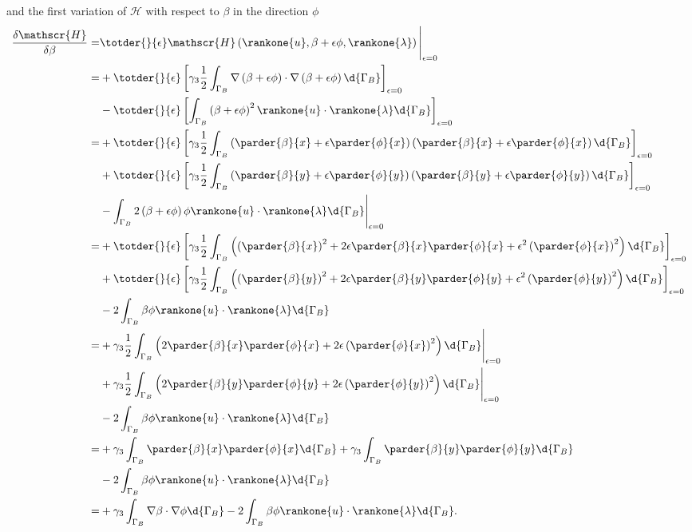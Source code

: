 and the first variation of $\mathscr{H}$ with respect to $\beta$ in the direction $\phi$
\begin{align*}
 \frac{\delta \mathscr{H}}{\delta \beta} =& \totder{}{\epsilon} \mathscr{H} \left(\rankone{u}, \beta + \epsilon \phi, \rankone{\lambda} \right) \Bigg|_{\epsilon = 0} \\
  =&+ \totder{}{\epsilon} \left[ \gamma_3 \frac{1}{2} \int_{\Gamma_B} \nabla \left(\beta + \epsilon \phi \right) \cdot \nabla \left(\beta + \epsilon \phi \right) \d{\Gamma_B} \right]_{\epsilon = 0} \\
  &- \totder{}{\epsilon} \left[ \int_{\Gamma_B} \left(\beta + \epsilon \phi\right)^2 \rankone{u} \cdot \rankone{\lambda} \d{\Gamma_B} \right]_{\epsilon = 0} \\
  =&+ \totder{}{\epsilon} \left[ \gamma_3 \frac{1}{2} \int_{\Gamma_B} \left(\parder{\beta}{x} + \epsilon \parder{\phi}{x} \right) \left(\parder{\beta}{x} + \epsilon \parder{\phi}{x} \right) \d{\Gamma_B} \right]_{\epsilon = 0} \\
  &+ \totder{}{\epsilon} \left[ \gamma_3 \frac{1}{2} \int_{\Gamma_B} \left(\parder{\beta}{y} + \epsilon \parder{\phi}{y} \right) \left(\parder{\beta}{y} + \epsilon \parder{\phi}{y} \right) \d{\Gamma_B} \right]_{\epsilon = 0} \\
  &- \int_{\Gamma_B} 2\left(\beta + \epsilon \phi\right)\phi \rankone{u} \cdot \rankone{\lambda} \d{\Gamma_B} \Bigg|_{\epsilon = 0} \\
  =&+ \totder{}{\epsilon} \left[ \gamma_3 \frac{1}{2} \int_{\Gamma_B} \left(\left(\parder{\beta}{x}\right)^2 + 2\epsilon \parder{\beta}{x}\parder{\phi}{x} + \epsilon^2 \left(\parder{\phi}{x}\right)^2 \right) \d{\Gamma_B} \right]_{\epsilon = 0} \\
  &+ \totder{}{\epsilon} \left[ \gamma_3 \frac{1}{2} \int_{\Gamma_B} \left(\left(\parder{\beta}{y}\right)^2 + 2\epsilon \parder{\beta}{y}\parder{\phi}{y} + \epsilon^2 \left(\parder{\phi}{y}\right)^2 \right) \d{\Gamma_B} \right]_{\epsilon = 0} \\
  &- 2 \int_{\Gamma_B} \beta \phi \rankone{u} \cdot \rankone{\lambda} \d{\Gamma_B} \\
  =&+ \gamma_3 \frac{1}{2} \int_{\Gamma_B} \left(2\parder{\beta}{x}\parder{\phi}{x} + 2\epsilon \left(\parder{\phi}{x}\right)^2 \right) \d{\Gamma_B} \Bigg|_{\epsilon = 0} \\
  &+ \gamma_3 \frac{1}{2} \int_{\Gamma_B} \left(2\parder{\beta}{y}\parder{\phi}{y} + 2\epsilon \left(\parder{\phi}{y}\right)^2 \right) \d{\Gamma_B} \Bigg|_{\epsilon = 0} \\
  &- 2 \int_{\Gamma_B} \beta \phi \rankone{u} \cdot \rankone{\lambda} \d{\Gamma_B} \\
  =&+ \gamma_3 \int_{\Gamma_B} \parder{\beta}{x}\parder{\phi}{x} \d{\Gamma_B} + \gamma_3 \int_{\Gamma_B} \parder{\beta}{y}\parder{\phi}{y} \d{\Gamma_B} \\
  &- 2 \int_{\Gamma_B} \beta \phi \rankone{u} \cdot \rankone{\lambda} \d{\Gamma_B} \\
  =&+ \gamma_3 \int_{\Gamma_B} \nabla \beta \cdot \nabla \phi \d{\Gamma_B} - 2 \int_{\Gamma_B} \beta \phi \rankone{u} \cdot \rankone{\lambda} \d{\Gamma_B}.
\end{align*}
